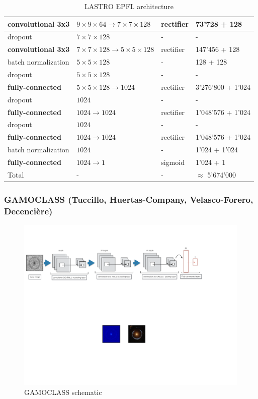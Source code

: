 \documentclass[useAMS,usenatbib]{mnras}
\begin{document}
\begin{table}
\begin{tabular}{|l|l|l|l|}
        \textbf{convolutional 3x3} & $9\times9\times64 \to 7\times7\times128$ & rectifier & 73'728 + 128 \\ \hline
        dropout & $7\times7\times128$ & - & - \\ \hline
        \textbf{convolutional 3x3} & $7\times7\times128 \to 5\times5\times128$ & rectifier & 147'456 + 128 \\ \hline
        batch normalization & $5\times5\times128$ & - & 128 + 128 \\ \hline
        dropout & $5\times5\times128$ & - & - \\ \hline
        
        \textbf{fully-connected} & $5\times5\times128 \to 1024$ & rectifier & 3'276'800 + 1'024 \\ \hline
        dropout & $1024$ & - & - \\ \hline
        \textbf{fully-connected} & $1024 \to 1024$ & rectifier & 1'048'576 + 1'024 \\ \hline
        dropout & $1024$ & - & - \\ \hline
        \textbf{fully-connected} & $1024 \to 1024$ & rectifier & 1'048'576 + 1'024 \\ \hline
        batch normalization & $1024$ & - & 1'024 + 1'024 \\ \hline
        \textbf{fully-connected} & $1024 \to 1$ & sigmoid & 1'024 + 1 \\ \hline \hline
        Total & - & - & $\approx$ 5'674'000 \\ \hline
    \end{tabular}
    \caption{LASTRO EPFL architecture}
    \label{tab:architecture}
\end{table}



\subsubsection{GAMOCLASS (Tuccillo, Huertas-Company, Velasco-Forero, Decenci\`ere)}

\begin{figure}
  \centering
      \includegraphics[width=1\columnwidth]{figures/Fig1_gamoclass.pdf} 
  \caption{GAMOCLASS schematic}
 \label{Fig1_gamoclass}
\end{figure}
\end{document}
